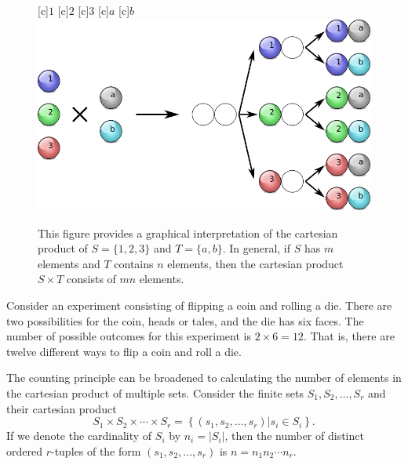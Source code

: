 \begin{figure}[htb!]
\begin{center}
\begin{psfrags}
[c]{$1$}
[c]{$2$}
[c]{$3$}
[c]{$a$}
[c]{$b$}
\includegraphics[height=6.495cm]{Figures/4Chapter/countingprinciple}
\end{psfrags}
\caption{This figure provides a graphical interpretation of the cartesian product of $S = \{ 1, 2, 3 \}$ and $T = \{ a, b \}$.
In general, if $S$ has $m$ elements and $T$ contains $n$ elements, then the cartesian product $S \times T$ consists of $m n$ elements.}
\label{figure:CountingPrinciple}
\end{center}
\end{figure}

\begin{example}
Consider an experiment consisting of flipping a coin and rolling a die.
There are two possibilities for the coin, heads or tales, and the die has six faces.
The number of possible outcomes for this experiment is $2 \times 6 = 12$.
That is, there are twelve different ways to flip a coin and roll a die.
\end{example}

The counting principle can be broadened to calculating the number of elements in the cartesian product of multiple sets.
Consider the finite sets $S_1, S_2, \ldots, S_r$ and their cartesian product
\begin{equation*}
S_1 \times S_2 \times \cdots \times S_r
= \left\{ (s_1, s_2, \ldots, s_r) | s_i \in S_i \right\} .
\end{equation*}
If we denote the cardinality of $S_i$ by $n_i = | S_i |$, then the number of distinct ordered $r$-tuples of the form $(s_1, s_2, \ldots, s_r)$ is $n = n_1 n_2 \cdots n_r$.

